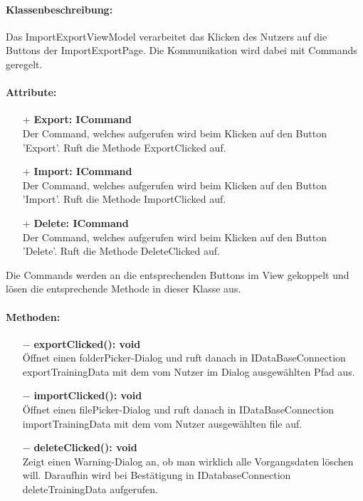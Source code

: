 \documentclass[a4paper,12pt]{article}
\begin{document}
\paragraph{Klassenbeschreibung:}
Das ImportExportViewModel verarbeitet das Klicken des Nutzers auf die Buttons  der ImportExportPage.
Die Kommunikation wird dabei mit Commands geregelt.
\paragraph{Attribute:}
\begin{itemize}
	\item[+] \textbf{Export: ICommand}\\Der Command, welches aufgerufen wird beim Klicken auf den Button 'Export'. Ruft die Methode ExportClicked auf.
	\item[+] \textbf{Import: ICommand}\\Der Command, welches aufgerufen wird beim Klicken auf den Button 'Import'. Ruft die Methode ImportClicked auf.
	\item[+] \textbf{Delete: ICommand}\\Der Command, welches aufgerufen wird beim Klicken auf den Button 'Delete'. Ruft die Methode DeleteClicked auf.
\end{itemize}
Die Commands werden an die entsprechenden Buttons im View gekoppelt und lösen die entsprechende Methode in dieser Klasse aus.
\paragraph{Methoden:}
\begin{itemize}
    \item[$-$] \textbf{exportClicked(): void}\\ Öffnet einen folderPicker-Dialog und ruft danach in IDataBaseConnection exportTrainingData mit dem vom Nutzer im Dialog ausgewählten Pfad aus.%
    \item[$-$] \textbf{importClicked(): void}\\ Öffnet einen filePicker-Dialog und ruft danach in IDataBaseConnection importTrainingData mit dem vom Nutzer ausgewählten file auf.
    \item[$-$] \textbf{deleteClicked(): void}\\Zeigt einen Warning-Dialog an, ob man wirklich alle Vorgangsdaten löschen will. Daraufhin wird bei Bestätigung in IDatabaseConnection deleteTrainingData aufgerufen.
\end{itemize} 
\end{document}
